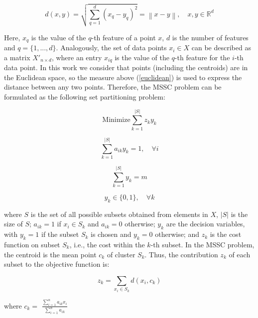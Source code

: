 \begin{equation}
\label{euclidean}
d(x,y) = \sqrt{\sum_{q=1}^{d}(x_{q} - y_{q})^2} = \left \| x - y \right \|, \quad x, y \in \mathbb{R}^d
\end{equation}

Here, $x_{q}$ is the value of the $q$-th feature of a point $x$, $d$ is the number of features and $q = \{1,...,d\}$. Analogously, the set of data points $x_i \in X$ can be described as a matrix $X'_{n \times d}$, where an entry $x_{iq}$ is the value of the $q$-th feature for the $i$-th data point. In this work we consider that points (including the centroids) are in the Euclidean space, so the measure above (\ref{euclidean}) is used to express the distance between any two points. Therefore, the MSSC problem can be formulated as the following set partitioning problem:

\pagebreak

\begin{equation} \label{eq:of}
\textrm{Minimize} \sum_{k=1}^{\left | S \right |}z_k y_k
\end{equation}

\begin{equation}
\sum_{k=1}^{\left | S \right |}a_{ik}y_k = 1, \quad \forall i
\end{equation}

\begin{equation}
\sum_{k=1}^{\left | S \right |}y_k = m
\end{equation}

\begin{equation}
y_k \in \{0,1\}, \quad \forall k
\end{equation}

\noindent where $S$ is the set of all possible subsets obtained from elements in $X$, $\left | S \right |$ is the size of $S$; $a_{ik} = 1$ if $x_i \in S_k$ and $a_{ik} = 0$ otherwise; $y_k$ are the decision variables, with $y_k = 1$ if the subset $S_k$ is chosen and $y_k = 0$ otherwise; and $z_k$ is the cost function on subset $S_k$, i.e., the cost within the $k$-th subset. In the MSSC problem, the centroid is the mean point $c_k$ of cluster $S_k$. Thus, the contribution $z_k$ of each subset to the objective function is:

\begin{equation}
z_k = \sum_{x_i \in S_k} d(x_i, c_k)
\end{equation}

\begin{center}
where $c_k = $ \Large $\frac{\sum_{i = 1}^{n}a_{ik}x_i}{\sum_{i = 1}^{n}a_{ik}}$	
\end{center}
	
